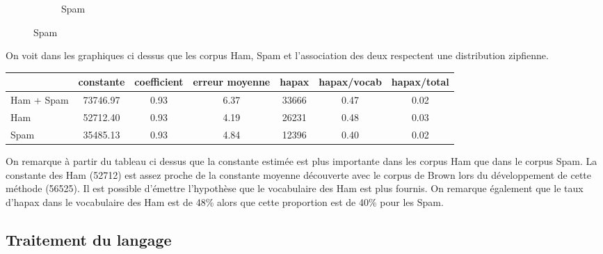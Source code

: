 \documentclass[a4paper,12pt]{article}
\begin{document}
\begin{figure}[H]
\begin{subfigure}[b]{0.3\linewidth}
  					\caption{Spam}
				\end{subfigure}  				
  				\label{fig:coffee}
			\end{figure}	
			
			On voit dans les graphiques ci dessus que les corpus Ham, Spam et l'association des deux respectent une distribution zipfienne.
			
			\begin{table}[H]
			\centering
				\begin{tabular}{|l|c|c|c||c|c|c|}
					\hline
								& constante & coefficient & erreur moyenne & hapax & hapax/vocab & hapax/total \\
					\hline
					Ham + Spam  & 73746.97  & 0.93        & 6.37	             & 33666 & 0.47              & 0.02 \\
					\hline
					Ham 		    & 52712.40  & 0.93        & 4.19              & 26231 & 0.48              & 0.03 \\
					\hline
					Spam		    & 35485.13  & 0.93        & 4.84              & 12396 & 0.40              & 0.02 \\
					\hline
				\end{tabular}
			\end{table}
			
			On remarque à partir du tableau ci dessus que la constante estimée est plus importante dans les corpus Ham que dans le corpus Spam. La constante des Ham (52712) est assez proche de la constante moyenne découverte avec le corpus de Brown lors du développement de cette méthode (56525). Il est possible d'émettre l'hypothèse que le vocabulaire des Ham est plus fournis. On remarque également que le taux d'hapax dans le vocabulaire des Ham est de 48\% alors que cette proportion est de 40\% pour les Spam.    
		
	\subsection{Traitement du langage}
		


	\newpage
\end{document}
